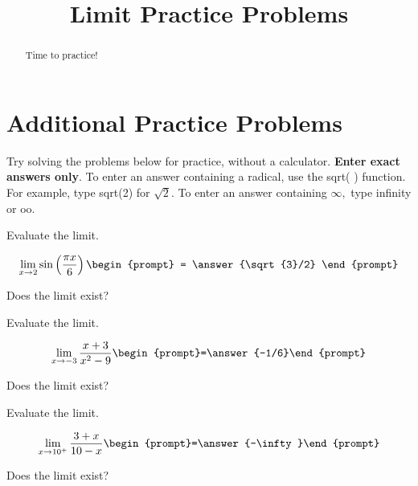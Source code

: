\documentclass{ximera}
\begin{document}
    \title{Limit Practice Problems}
    \begin{abstract} Time to practice! \end{abstract}
    \maketitle

\section*{Additional Practice Problems}

Try solving the problems below for practice, without a calculator.  \textbf{Enter exact answers only}.  To enter an answer
containing a radical, use the sqrt( ) function.  For example, type sqrt(2) for $\sqrt{2}.$  To enter an answer containing $\infty,$ type infinity or oo.

\begin{problem}
Evaluate the limit.

\[ \lim_{x \rightarrow 2} \sin \left( \frac{\pi x}{6} \right)  \begin{prompt} = \answer{\sqrt{3}/2} \end{prompt} \]


Does the limit exist?

\begin{multipleChoice}
  \end{multipleChoice}

\end{problem}


\begin{problem}

Evaluate the limit.

\[ \lim_{x\to -3} \frac{x+3}{x^2-9}\begin{prompt}=\answer{-1/6}\end{prompt} \]


Does the limit exist?


\begin{multipleChoice}
  \end{multipleChoice}

\end{problem}


\begin{problem}

Evaluate the limit.

\[\lim_{x\to 10^+} \frac{3+x}{10-x}  \begin{prompt}=\answer{-\infty}\end{prompt}\]


Does the limit exist?

\begin{multipleChoice}
  \end{multipleChoice}

\end{problem}
\end{document}
